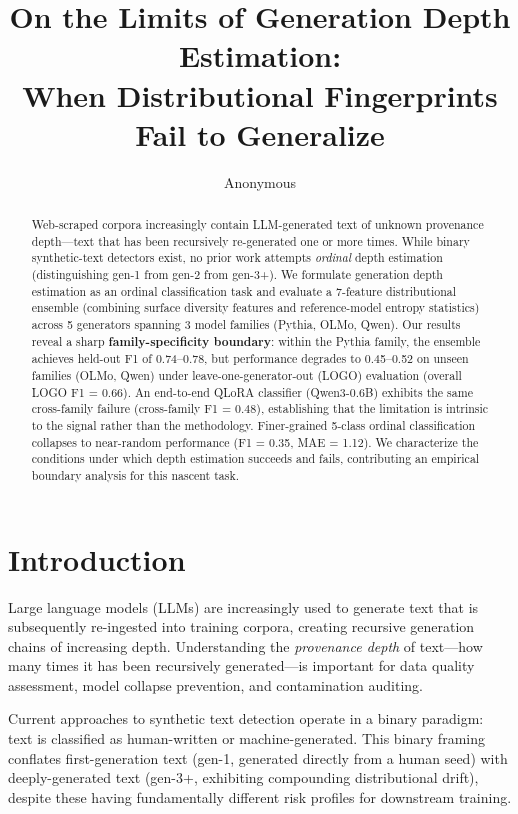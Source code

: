 \documentclass[11pt,a4paper]{article}
\title{On the Limits of Generation Depth Estimation:\\When Distributional Fingerprints Fail to Generalize}
\author{Anonymous}
\date{}
\begin{document}
\maketitle

\begin{abstract}
Web-scraped corpora increasingly contain LLM-generated text of unknown provenance depth---text that has been recursively re-generated one or more times.
While binary synthetic-text detectors exist, no prior work attempts \emph{ordinal} depth estimation (distinguishing gen-1 from gen-2 from gen-3+).
We formulate generation depth estimation as an ordinal classification task and evaluate a 7-feature distributional ensemble (combining surface diversity features and reference-model entropy statistics) across 5 generators spanning 3 model families (Pythia, OLMo, Qwen).
Our results reveal a sharp \textbf{family-specificity boundary}: within the Pythia family, the ensemble achieves held-out F1 of 0.74--0.78, but performance degrades to 0.45--0.52 on unseen families (OLMo, Qwen) under leave-one-generator-out (LOGO) evaluation (overall LOGO F1 = 0.66).
An end-to-end QLoRA classifier (Qwen3-0.6B) exhibits the same cross-family failure (cross-family F1 = 0.48), establishing that the limitation is intrinsic to the signal rather than the methodology.
Finer-grained 5-class ordinal classification collapses to near-random performance (F1 = 0.35, MAE = 1.12).
We characterize the conditions under which depth estimation succeeds and fails, contributing an empirical boundary analysis for this nascent task.
\end{abstract}

\section{Introduction}

Large language models (LLMs) are increasingly used to generate text that is subsequently re-ingested into training corpora, creating recursive generation chains of increasing depth.
Understanding the \emph{provenance depth} of text---how many times it has been recursively generated---is important for data quality assessment, model collapse prevention, and contamination auditing.

Current approaches to synthetic text detection operate in a binary paradigm: text is classified as human-written or machine-generated.
This binary framing conflates first-generation text (gen-1, generated directly from a human seed) with deeply-generated text (gen-3+, exhibiting compounding distributional drift), despite these having fundamentally different risk profiles for downstream training.
\end{document}
